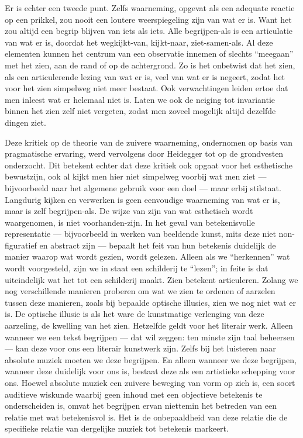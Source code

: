 Er is echter een tweede punt. Zelfs waarneming, opgevat als een adequate reactie op een prikkel, zou nooit een loutere weerspiegeling zijn van wat er is. Want het zou altijd een begrip blijven van iets als iets. Alle begrijpen-als is een articulatie van wat er is, doordat het wegkijkt-van, kijkt-naar, ziet-samen-als. Al deze elementen kunnen het centrum van een observatie innemen of slechts ``meegaan'' met het zien, aan de rand of op de achtergrond. Zo is het onbetwist dat het zien, als een articulerende lezing van wat er is, veel van wat er is negeert, zodat het voor het zien simpelweg niet meer bestaat. Ook verwachtingen leiden ertoe dat men inleest wat er helemaal niet is. Laten we ook de neiging tot invariantie binnen het zien zelf niet vergeten, zodat men zoveel mogelijk altijd dezelfde dingen ziet.

Deze kritiek op de theorie van de zuivere waarneming, ondernomen op basis van pragmatische ervaring, werd vervolgens door Heidegger tot op de grondvesten onderzocht. Dit betekent echter dat deze kritiek ook opgaat voor het esthetische bewustzijn, ook al kijkt men hier niet simpelweg voorbij wat men ziet — bijvoorbeeld naar het algemene gebruik voor een doel — maar erbij stilstaat. Langdurig kijken en verwerken is geen eenvoudige waarneming van wat er is, maar is zelf begrijpen-als. De wijze van zijn van wat esthetisch wordt waargenomen, is niet voorhanden-zijn. In het geval van betekenisvolle representatie — bijvoorbeeld in werken van beeldende kunst, mits deze niet non-figuratief en abstract zijn — bepaalt het feit van hun betekenis duidelijk de manier waarop wat wordt gezien, wordt gelezen. Alleen als we ``herkennen'' wat wordt voorgesteld, zijn we in staat een schilderij te ``lezen''; in feite is dat uiteindelijk wat het tot een schilderij maakt. Zien betekent articuleren. Zolang we nog verschillende manieren proberen om wat we zien te ordenen of aarzelen tussen deze manieren, zoals bij bepaalde optische illusies, zien we nog niet wat er is. De optische illusie is als het ware de kunstmatige verlenging van deze aarzeling, de kwelling van het zien. Hetzelfde geldt voor het literair werk. Alleen wanneer we een tekst begrijpen — dat wil zeggen: ten minste zijn taal beheersen — kan deze voor ons een literair kunstwerk zijn. Zelfs bij het luisteren naar absolute muziek moeten we deze begrijpen. En alleen wanneer we deze begrijpen, wanneer deze duidelijk voor ons is, bestaat deze als een artistieke schepping voor ons. Hoewel absolute muziek een zuivere beweging van vorm op zich is, een soort auditieve wiskunde waarbij geen inhoud met een objectieve betekenis te onderscheiden is, omvat het begrijpen ervan niettemin het betreden van een relatie met wat betekenisvol is. Het is de onbepaaldheid van deze relatie die de specifieke relatie van dergelijke muziek tot betekenis markeert.

